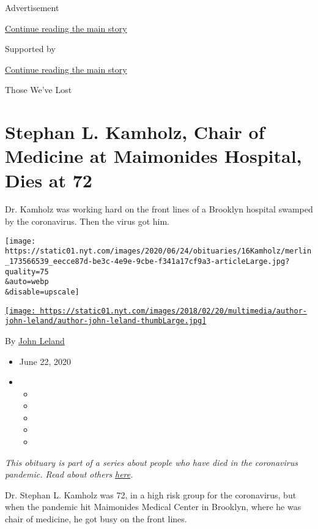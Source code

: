 Advertisement

\protect\hyperlink{after-top}{Continue reading the main story}

Supported by

\protect\hyperlink{after-sponsor}{Continue reading the main story}

Those We've Lost

\hypertarget{stephan-l-kamholz-chair-of-medicine-at-maimonides-hospital-dies-at-72}{%
\section{Stephan L. Kamholz, Chair of Medicine at Maimonides Hospital,
Dies at
72}\label{stephan-l-kamholz-chair-of-medicine-at-maimonides-hospital-dies-at-72}}

Dr. Kamholz was working hard on the front lines of a Brooklyn hospital
swamped by the coronavirus. Then the virus got him.

\texttt{[image: https://static01.nyt.com/images/2020/06/24/obituaries/16Kamholz/merlin\_173566539\_eecce87d-be3c-4e9e-9cbe-f341a17cf9a3-articleLarge.jpg?quality=75\\\&auto=webp\\\&disable=upscale]}

\href{https://www.nytimes.com/by/john-leland}{\texttt{[image: https://static01.nyt.com/images/2018/02/20/multimedia/author-john-leland/author-john-leland-thumbLarge.jpg]}}

By \href{https://www.nytimes.com/by/john-leland}{John Leland}

\begin{itemize}
\item
  June 22, 2020
\item
  \begin{itemize}
  \item
  \item
  \item
  \item
  \item
  \end{itemize}
\end{itemize}

\emph{This obituary is part of a series about people who have died in
the coronavirus pandemic. Read about others}
\href{https://www.nytimes.com/interactive/2020/obituaries/people-died-coronavirus-obituaries.html}{\emph{here}}\emph{.}

Dr. Stephan L. Kamholz was 72, in a high risk group for the coronavirus,
but when the pandemic hit Maimonides Medical Center in Brooklyn, where
he was chair of medicine, he got busy on the front lines.

